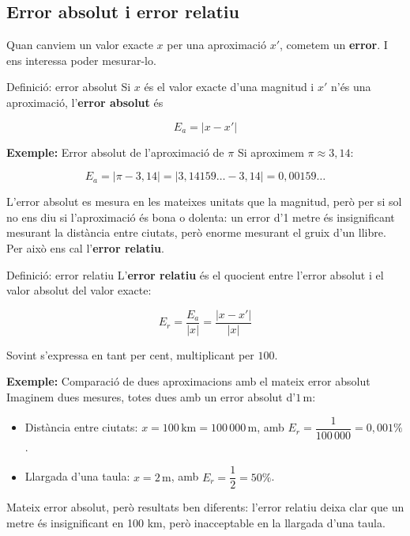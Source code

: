 \subsection{Error absolut i error relatiu}

Quan canviem un valor exacte $x$ per una aproximació $x'$, cometem un \textbf{error}. I ens interessa poder mesurar-lo.

\begin{definicio}{Definició: error absolut}
Si $x$ és el valor exacte d'una magnitud i $x'$ n'és una aproximació, l'\textbf{error absolut} és

\[
E_a = |x - x'|
\]
\end{definicio}

\begin{exemple}{\textbf{Exemple:} Error absolut de l'aproximació de $\pi$}
Si aproximem $\pi \approx 3{,}14$:

\[
E_a = |\pi - 3{,}14| = |3{,}14159\ldots - 3{,}14| = 0{,}00159\ldots
\]
\end{exemple}

L'error absolut es mesura en les mateixes unitats que la magnitud, però per si sol no ens diu si l'aproximació és bona o dolenta: un error d'1 metre és insignificant mesurant la distància entre ciutats, però enorme mesurant el gruix d'un llibre. Per això ens cal l'\textbf{error relatiu}.

\begin{definicio}{Definició: error relatiu}
L'\textbf{error relatiu} és el quocient entre l'error absolut i el valor absolut del valor exacte:

\[
E_r = \frac{E_a}{|x|} = \frac{|x-x'|}{|x|}
\]

Sovint s'expressa en tant per cent, multiplicant per $100$.
\end{definicio}

\begin{exemple}{\textbf{Exemple:} Comparació de dues aproximacions amb el mateix error absolut}
Imaginem dues mesures, totes dues amb un error absolut d'$1\,\text{m}$:

\begin{itemize}
\item Distància entre ciutats: $x = 100\,\text{km} = 100\,000\,\text{m}$, amb $E_r = \dfrac{1}{100\,000} = 0{,}001\%$.
\item Llargada d'una taula: $x = 2\,\text{m}$, amb $E_r = \dfrac{1}{2} = 50\%$.
\end{itemize}

Mateix error absolut, però resultats ben diferents: l'error relatiu deixa clar que un metre és insignificant en 100 km, però inacceptable en la llargada d'una taula.
\end{exemple}

